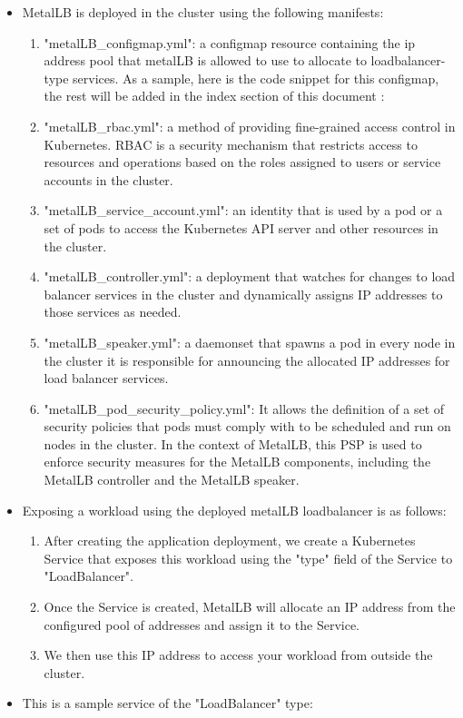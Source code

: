 \begin{enumerate}[label = (\alph*)]
    \begin{itemize}[label={--}]
        \item MetalLB is deployed in the cluster using the following manifests: 
            \begin{enumerate}[label = (\arabic*)]
            \item "metalLB\_configmap.yml": a configmap resource containing the ip address pool that metalLB is allowed to use to allocate to loadbalancer-type services. As a sample, here is the code snippet for this configmap, the rest will be added in the index section of this document : 
            \item "metalLB\_rbac.yml": a method of providing fine-grained access control in Kubernetes. RBAC is a security mechanism that restricts access to resources and operations based on the roles assigned to users or service accounts in the cluster. 
            \item "metalLB\_service\_account.yml": an identity that is used by a pod or a set of pods to access the Kubernetes API server and other resources in the cluster. 
            \item "metalLB\_controller.yml": a deployment that watches for changes to load balancer services in the cluster and dynamically assigns IP addresses to those services as needed. 
            \item "metalLB\_speaker.yml": a daemonset that spawns a pod in every node in the cluster it is responsible for announcing the allocated IP addresses for load balancer services. 
            \item "metalLB\_pod\_security\_policy.yml": It allows the definition of a set of security policies that pods must comply with to be scheduled and run on nodes in the cluster. In the context of MetalLB, this PSP is used to enforce security measures for the MetalLB components, including the MetalLB controller and the MetalLB speaker. 
            \end{enumerate}

        \item Exposing a workload using the deployed metalLB loadbalancer is as follows: 
            \begin{enumerate}[label = (\arabic*)]
                \item After creating the application deployment, we create a Kubernetes Service that exposes this workload using the "type" field of the Service to "LoadBalancer". 
                \item Once the Service is created, MetalLB will allocate an IP address from the configured pool of addresses and assign it to the Service. 
                \item We then use this IP address to access your workload from outside the cluster. 
            \end{enumerate}
        \item This is a sample service of the "LoadBalancer" type: 
        

\end{itemize}
\end{enumerate}

